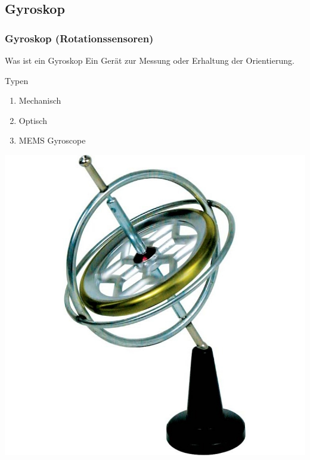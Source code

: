 \documentclass[10pt,a4paper,oneside]{beamer}
\begin{document}
\begin{frame}
  \subsection{Gyroskop}
  \frametitle{Gyroskop (Rotationssensoren)}
  
  \begin{block}{Was ist ein Gyroskop}
  	Ein Gerät zur Messung oder Erhaltung der Orientierung.
  \end{block}
  
  \bigskip
  
  Typen
  \begin{enumerate}
  	\item Mechanisch
  	\item Optisch
  	\item MEMS Gyroscope
  \end{enumerate}
  
	\begin{center}
  		\includegraphics[scale=0.09]{images/Original_gyroscope-1000x1000.jpg} 
	\end{center}
\end{frame}
\end{document}
